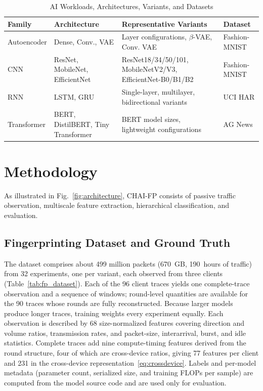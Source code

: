\documentclass[conference]{IEEEtran}
\begin{document}
\begin{table}[!htbp]
\centering
\caption{AI Workloads, Architectures, Variants, and Datasets}
\label{tab:ai_workloads}
\scriptsize
\renewcommand{\arraystretch}{1.10}
\setlength{\tabcolsep}{2pt}
\begin{tabular}{
>{\RaggedRight\arraybackslash}p{}
>{\RaggedRight\arraybackslash}p{}
>{\RaggedRight\arraybackslash}p{}
>{\RaggedRight\arraybackslash}p{}
}
\hline
\textbf{Family} &
\textbf{Architecture} &
\textbf{Representative Variants} &
\textbf{Dataset} \\
\hline
Autoencoder &
Dense, Conv., VAE &
Layer configurations, $\beta$-VAE, Conv. VAE &
Fashion-MNIST \\
CNN &
ResNet, MobileNet, EfficientNet &
ResNet18/34/50/101, MobileNetV2/V3,
EfficientNet-B0/B1/B2 &
Fashion-MNIST \\
RNN &
LSTM, GRU &
Single-layer, multilayer,
bidirectional variants &
UCI HAR \\
Transformer &
BERT, DistilBERT, Tiny Transformer &
BERT model sizes,
lightweight configurations &
AG News \\
\hline
\end{tabular}
\end{table}

\section{Methodology}
\label{sec:methodology}
As illustrated in Fig.~\ref{fig:architecture}, CHAI-FP consists of passive
traffic observation, multiscale feature extraction, hierarchical classification,
and evaluation.

\subsection{Fingerprinting Dataset and Ground Truth}
\label{subsec:dataset}
The dataset comprises about 499 million packets (670~GB, 190~hours of traffic)
from 32 experiments, one per variant, each observed from three clients
(Table~\ref{tab:fp_dataset}). Each of the 96 client traces yields one
complete-trace observation and a sequence of windows; round-level quantities
are available for the 90 traces whose rounds are fully reconstructed. Because
larger models produce longer traces, training weights every experiment equally.
Each observation is described by 68 size-normalized features covering direction
and volume ratios, transmission rates, and packet-size, interarrival, burst, and
idle statistics. Complete traces add nine compute-timing features derived from
the round structure, four of which are cross-device ratios, giving 77 features
per client and 231 in the cross-device
representation~\eqref{eq:crossdevice}. Labels and per-model metadata (parameter
count, serialized size, and training FLOPs per sample) are computed from the
model source code and are used only for evaluation.
\end{document}
